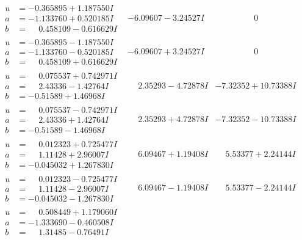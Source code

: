 \documentclass[1p]{elsarticle_modified}
\theoremstyle{definition}
\begin{document}
$$\begin{array}{c|c|c}
\begin{aligned}
u &= -0.365895 + 1.187550 I \\
a &= -1.133760 + 0.520185 I \\
b &= \phantom{-}0.458109 - 0.616629 I\end{aligned}
 & -6.09607 - 3.24527 I & \phantom{-0.000000 } 0 \\ \hline\begin{aligned}
u &= -0.365895 - 1.187550 I \\
a &= -1.133760 - 0.520185 I \\
b &= \phantom{-}0.458109 + 0.616629 I\end{aligned}
 & -6.09607 + 3.24527 I & \phantom{-0.000000 } 0 \\ \hline\begin{aligned}
u &= \phantom{-}0.075537 + 0.742971 I \\
a &= \phantom{-}2.43336 - 1.42764 I \\
b &= -0.51589 + 1.46968 I\end{aligned}
 & \phantom{-}2.35293 - 4.72878 I & -7.32352 + 10.73388 I \\ \hline\begin{aligned}
u &= \phantom{-}0.075537 - 0.742971 I \\
a &= \phantom{-}2.43336 + 1.42764 I \\
b &= -0.51589 - 1.46968 I\end{aligned}
 & \phantom{-}2.35293 + 4.72878 I & -7.32352 - 10.73388 I \\ \hline\begin{aligned}
u &= \phantom{-}0.012323 + 0.725477 I \\
a &= \phantom{-}1.11428 + 2.96007 I \\
b &= -0.045032 + 1.267830 I\end{aligned}
 & \phantom{-}6.09467 + 1.19408 I & \phantom{-}5.53377 + 2.24144 I \\ \hline\begin{aligned}
u &= \phantom{-}0.012323 - 0.725477 I \\
a &= \phantom{-}1.11428 - 2.96007 I \\
b &= -0.045032 - 1.267830 I\end{aligned}
 & \phantom{-}6.09467 - 1.19408 I & \phantom{-}5.53377 - 2.24144 I \\ \hline\begin{aligned}
u &= \phantom{-}0.508449 + 1.179060 I \\
a &= -1.333690 - 0.460508 I \\
b &= \phantom{-}1.31485 - 0.76491 I\end{aligned}

\end{array}$$
\end{document}
